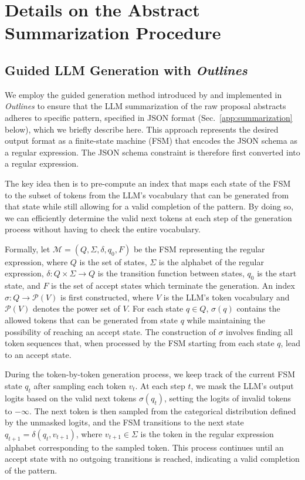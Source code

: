 \documentclass[10pt]{article} %
\newcommand{\package}[1]{\textsl{#1}\xspace}
\begin{document}



\appendix

\section{Details on the Abstract Summarization Procedure}

\subsection{Guided LLM Generation with \package{Outlines}}
\label{app:guided-generation}

We employ the guided generation method introduced by \citet{willard2023efficient} and implemented in \package{Outlines} to ensure that the LLM summarization of the raw proposal abstracts adheres to specific pattern, specified in JSON format (Sec.~\ref{app:summarization} below), which we briefly describe here. This approach represents the desired output format as a finite-state machine (FSM) that encodes the JSON schema as a regular expression. The JSON schema constraint is therefore first converted into a regular expression.

The key idea then is to pre-compute an index that maps each state of the FSM to the subset of tokens from the LLM's vocabulary that can be generated from that state while still allowing for a valid completion of the pattern. By doing so, we can efficiently determine the valid next tokens at each step of the generation process without having to check the entire vocabulary.

Formally, let $\mathcal{M} = (Q, \Sigma, \delta, q_0, F)$ be the FSM representing the regular expression, where $Q$ is the set of states, $\Sigma$ is the alphabet of the regular expression, $\delta: Q \times \Sigma \rightarrow Q$ is the transition function between states, $q_0$ is the start state, and $F$ is the set of accept states which terminate the generation. An index $\sigma: Q \rightarrow \mathcal{P}(V)$ is first constructed, where $V$ is the LLM's token vocabulary and $\mathcal{P}(V)$ denotes the power set of $V$. For each state $q \in Q$, $\sigma(q)$ contains the allowed tokens that can be generated from state $q$ while maintaining the possibility of reaching an accept state. The construction of $\sigma$ involves finding all token sequences that, when processed by the FSM starting from each state $q$, lead to an accept state.

During the token-by-token generation process, we keep track of the current FSM state $q_t$ after sampling each token $v_t$. At each step $t$, we mask the LLM's output logits based on the valid next tokens $\sigma(q_t)$, setting the logits of invalid tokens to $-\infty$. The next token is then sampled from the categorical distribution defined by the unmasked logits, and the FSM transitions to the next state $q_{t+1} = \delta(q_t, v_{t+1})$, where $v_{t+1} \in \Sigma$ is the token in the regular expression alphabet corresponding to the sampled token. This process continues until an accept state with no outgoing transitions is reached, indicating a valid completion of the pattern.
\end{document}
